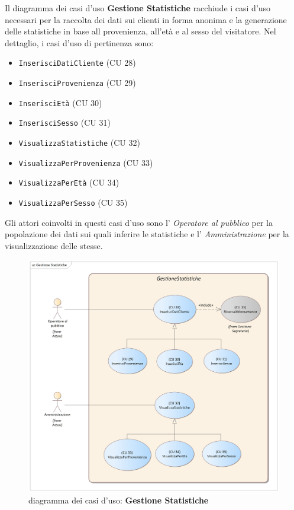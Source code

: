 \documentclass{article}
\begin{document}
\indent\indent Il diagramma dei casi d'uso \textbf{Gestione Statistiche} racchiude i casi d'uso necessari per la raccolta dei dati sui clienti in forma anonima e la generazione delle statistiche in base all provenienza, all'età e al sesso del visitatore. Nel dettaglio, i casi d'uso di pertinenza sono:
\medskip
\begin{itemize}[itemsep=4pt]
  \item \texttt{InserisciDatiCliente} (CU 28)
  \item \texttt{InserisciProvenienza} (CU 29)
  \item \texttt{InserisciEtà} (CU 30)
  \item \texttt{InserisciSesso} (CU 31)
  \item \texttt{VisualizzaStatistiche} (CU 32)
  \item \texttt{VisualizzaPerProvenienza} (CU 33)
  \item \texttt{VisualizzaPerEtà} (CU 34)
  \item \texttt{VisualizzaPerSesso} (CU 35)
\end{itemize}
\medskip
Gli attori coinvolti in questi casi d'uso sono l' \emph{Operatore al pubblico} per la popolazione dei dati sui quali inferire le statistiche e  l' \emph{Amministrazione} per la visualizzazione delle stesse.

\begin{figure}[h]
    \centering
    \includegraphics[width=1\textwidth]{Gestione Statistiche}
    \caption{diagramma dei casi d'uso: \textbf{Gestione Statistiche}}
    \label{fig:GestioneStatistiche}
\end{figure}
\end{document}
